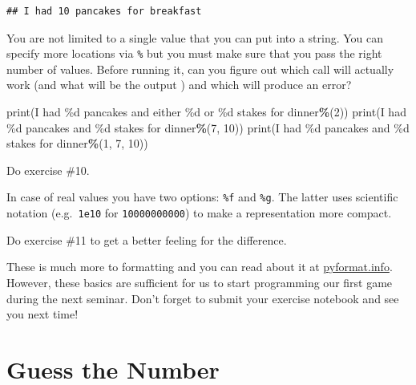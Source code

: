 \documentclass[
]{book}
\newenvironment{Shaded}{\begin{snugshade}}{\end{snugshade}}
\newcommand{\BuiltInTok}[1]{#1}
\newcommand{\DecValTok}[1]{\textcolor[rgb]{0.00,0.00,0.81}{#1}}
\newcommand{\NormalTok}[1]{#1}
\newcommand{\OperatorTok}[1]{\textcolor[rgb]{0.81,0.36,0.00}{\textbf{#1}}}
\newcommand{\SpecialCharTok}[1]{\textcolor[rgb]{0.00,0.00,0.00}{#1}}
\newcommand{\StringTok}[1]{\textcolor[rgb]{0.31,0.60,0.02}{#1}}
\begin{document}
\begin{verbatim}
## I had 10 pancakes for breakfast
\end{verbatim}

You are not limited to a single value that you can put into a string. You can specify more locations via \texttt{\%} but you must make sure that you pass the right number of values. Before running it, can you figure out which call will actually work (and what will be the output ) and which will produce an error?

\begin{Shaded}
\begin{Highlighting}[]
\BuiltInTok{print}\NormalTok{(}\StringTok{\textquotesingle{}I had }\SpecialCharTok{\%d}\StringTok{ pancakes and either }\SpecialCharTok{\%d}\StringTok{  or }\SpecialCharTok{\%d}\StringTok{ stakes for dinner\textquotesingle{}}\OperatorTok{\%}\NormalTok{(}\DecValTok{2}\NormalTok{))}
\BuiltInTok{print}\NormalTok{(}\StringTok{\textquotesingle{}I had }\SpecialCharTok{\%d}\StringTok{ pancakes and }\SpecialCharTok{\%d}\StringTok{ stakes for dinner\textquotesingle{}}\OperatorTok{\%}\NormalTok{(}\DecValTok{7}\NormalTok{, }\DecValTok{10}\NormalTok{))}
\BuiltInTok{print}\NormalTok{(}\StringTok{\textquotesingle{}I had }\SpecialCharTok{\%d}\StringTok{ pancakes and }\SpecialCharTok{\%d}\StringTok{ stakes for dinner\textquotesingle{}}\OperatorTok{\%}\NormalTok{(}\DecValTok{1}\NormalTok{, }\DecValTok{7}\NormalTok{, }\DecValTok{10}\NormalTok{))}
\end{Highlighting}
\end{Shaded}

Do exercise \#10.

In case of real values you have two options: \texttt{\%f} and \texttt{\%g}. The latter uses scientific notation (e.g.~\texttt{1e10} for \texttt{10000000000}) to make a representation more compact.

Do exercise \#11 to get a better feeling for the difference.

These is much more to formatting and you can read about it at \href{https://pyformat.info/}{pyformat.info}. However, these basics are sufficient for us to start programming our first game during the next seminar. Don't forget to submit your exercise notebook and see you next time!

\hypertarget{seminar02}{%
\chapter{Guess the Number}\label{seminar02}}
\end{document}
